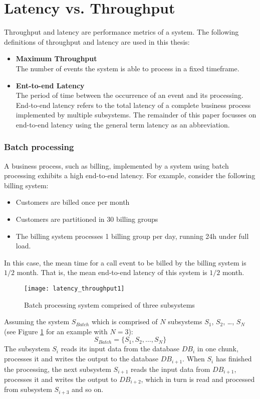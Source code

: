 \section{Latency vs. Throughput}\label{sec:ch2_latency_throughput}
Throughput and latency are performance metrics of a system. The following definitions of throughput and latency are used in this thesis:
\begin{itemize}
	\item \textbf{Maximum Throughput}\\
	The number of events the system is able to process in a fixed timeframe.
 	\item \textbf{Ent-to-end Latency}\\
	The period of time between the occurrence of an event and its processing. End-to-end latency refers to the total latency of a complete business process implemented by multiple subsystems. The remainder of this paper focusses on end-to-end latency using the general term latency as an abbreviation.
\end{itemize}
\subsubsection{Batch processing}
A business process, such as billing, implemented by a system using batch processing exhibits a high end-to-end latency. For example, consider the following billing system:
\begin{itemize}
	\item Customers are billed once per month
	\item Customers are partitioned in 30 billing groups
	\item The billing system processes 1 billing group per day, running 24h under full load.
\end{itemize}

In this case, the mean time for a call event to be billed by the billing system is $1/2$ month. That is, the mean end-to-end latency of this system is $1/2$ month.

\begin{figure}[h!]
	\centering
	\texttt{[image: latency\_throughput1]}
	\caption{Batch processing system comprised of three subsystems}
	\label{fig:batch_processing_latency}
\end{figure}

Assuming the system $S_{Batch}$ which is comprised of $N$ subsystems $S_1$, $S_2$, \ldots, $S_N$ (see Figure \ref{fig:batch_processing_latency} for an example with $N=3$):
\begin{displaymath}
S_{Batch} = \{S_1, S_2, \ldots, S_N\}
\end{displaymath}
The subsystem $S_i$ reads its input data from the database $DB_i$ in one chunk, processes it and writes the output to the database $DB_{i+1}$. When $S_i$ has finished the processing, the next subsystem $S_{i+1}$ reads the input data from $DB_{i+1}$, processes it and writes the output to $DB_{i+2}$, which in turn is read and processed from subsystem $S_{i+3}$ and so on.

